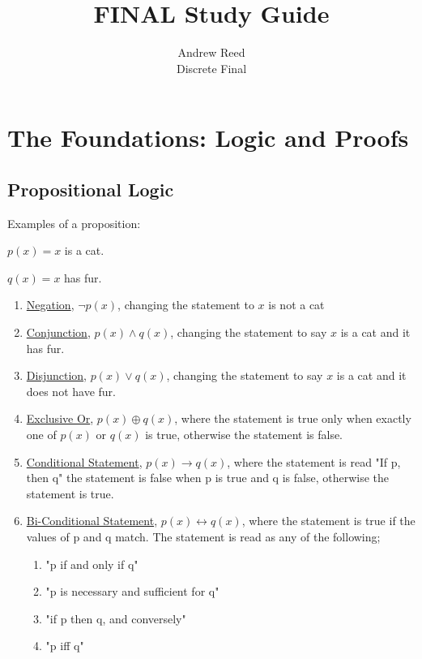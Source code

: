 \documentclass[12pt]{article}
\begin{document}
 
 
\title{FINAL Study Guide}%
\author{Andrew Reed\\ %
Discrete Final} %
 
\maketitle

\tableofcontents

\pagebreak

\quad

\quad

\section{The Foundations: Logic and Proofs}

\subsection{Propositional Logic}

Examples of a proposition:

$p(x) = x$ is a cat.

$q(x) = x$ has fur.

\begin{enumerate}
\item \underline{Negation}, $\neg p(x)$, changing the statement to $x$ is not a cat
\item \underline{Conjunction}, $p(x) \wedge q(x)$, changing the statement to say $x$ is a cat and it has fur.
\item \underline{Disjunction}, $p(x) \lor q(x)$, changing the statement to say $x$ is a cat and it does not have fur.
\item \underline{Exclusive Or},  $p(x) \oplus q(x)$, where the statement is true only when exactly one of $p(x)$ or $q(x)$ is true, otherwise the statement is false.
\item \underline{Conditional Statement}, $p(x) \rightarrow q(x)$,  where the statement is read "If p, then q" the statement is false when p is true and q is false, otherwise the statement is true.
\item \underline{Bi-Conditional Statement}, $p(x) \leftrightarrow q(x)$, where the statement is true if the values of p and q match. The statement is read as any of the following;
	\begin{enumerate}
	\item "p if and only if q"
	\item "p is necessary and sufficient for q"
	\item "if p then q, and conversely"
	\item "p iff q"
	\end{enumerate}
\end{enumerate}
\end{document}
